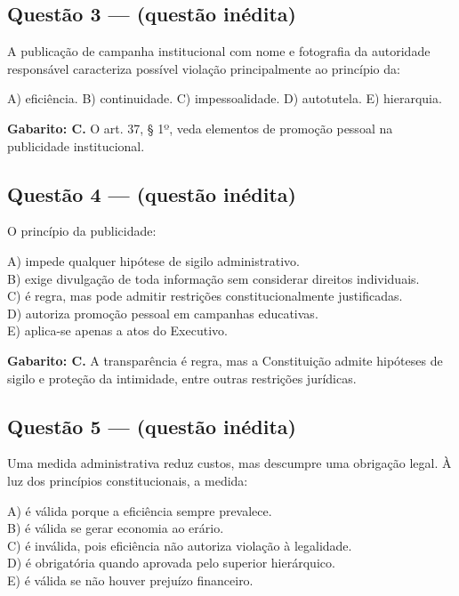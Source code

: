 \documentclass[11pt,a4paper]{article}
\begin{document}
\subsection*{Questão 3 — (questão inédita)}

A publicação de campanha institucional com nome e fotografia da autoridade responsável caracteriza possível violação principalmente ao princípio da:

A) eficiência. B) continuidade. C) impessoalidade. D) autotutela. E) hierarquia.

\begin{alerta}
\textbf{Gabarito: C.} O art. 37, § 1º, veda elementos de promoção pessoal na publicidade institucional.
\end{alerta}

\subsection*{Questão 4 — (questão inédita)}

O princípio da publicidade:

A) impede qualquer hipótese de sigilo administrativo. \\ B) exige divulgação de toda informação sem considerar direitos individuais. \\ C) é regra, mas pode admitir restrições constitucionalmente justificadas. \\ D) autoriza promoção pessoal em campanhas educativas. \\ E) aplica-se apenas a atos do Executivo.

\begin{alerta}
\textbf{Gabarito: C.} A transparência é regra, mas a Constituição admite hipóteses de sigilo e proteção da intimidade, entre outras restrições jurídicas.
\end{alerta}

\subsection*{Questão 5 — (questão inédita)}

Uma medida administrativa reduz custos, mas descumpre uma obrigação legal. À luz dos princípios constitucionais, a medida:

A) é válida porque a eficiência sempre prevalece. \\ B) é válida se gerar economia ao erário. \\ C) é inválida, pois eficiência não autoriza violação à legalidade. \\ D) é obrigatória quando aprovada pelo superior hierárquico. \\ E) é válida se não houver prejuízo financeiro.
\end{document}
